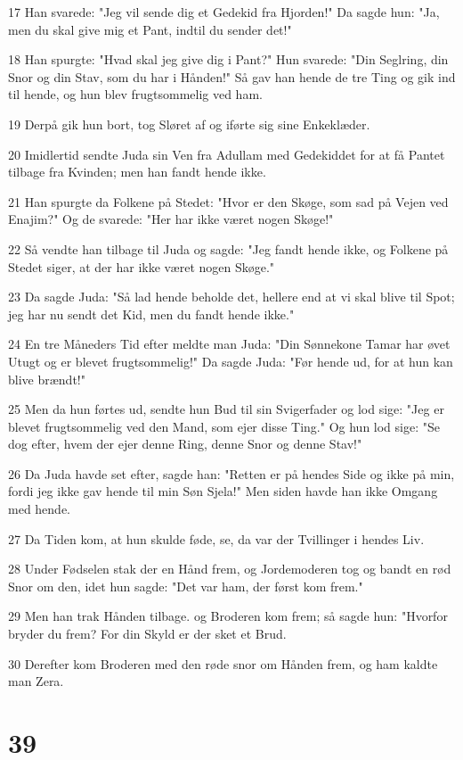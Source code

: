 \par 17 Han svarede: "Jeg vil sende dig et Gedekid fra Hjorden!" Da sagde hun: "Ja, men du skal give mig et Pant, indtil du sender det!"
\par 18 Han spurgte: "Hvad skal jeg give dig i Pant?" Hun svarede: "Din Seglring, din Snor og din Stav, som du har i Hånden!" Så gav han hende de tre Ting og gik ind til hende, og hun blev frugtsommelig ved ham.
\par 19 Derpå gik hun bort, tog Sløret af og iførte sig sine Enkeklæder.
\par 20 Imidlertid sendte Juda sin Ven fra Adullam med Gedekiddet for at få Pantet tilbage fra Kvinden; men han fandt hende ikke.
\par 21 Han spurgte da Folkene på Stedet: "Hvor er den Skøge, som sad på Vejen ved Enajim?" Og de svarede: "Her har ikke været nogen Skøge!"
\par 22 Så vendte han tilbage til Juda og sagde: "Jeg fandt hende ikke, og Folkene på Stedet siger, at der har ikke været nogen Skøge."
\par 23 Da sagde Juda: "Så lad hende beholde det, hellere end at vi skal blive til Spot; jeg har nu sendt det Kid, men du fandt hende ikke."
\par 24 En tre Måneders Tid efter meldte man Juda: "Din Sønnekone Tamar har øvet Utugt og er blevet frugtsommelig!" Da sagde Juda: "Før hende ud, for at hun kan blive brændt!"
\par 25 Men da hun førtes ud, sendte hun Bud til sin Svigerfader og lod sige: "Jeg er blevet frugtsommelig ved den Mand, som ejer disse Ting." Og hun lod sige: "Se dog efter, hvem der ejer denne Ring, denne Snor og denne Stav!"
\par 26 Da Juda havde set efter, sagde han: "Retten er på hendes Side og ikke på min, fordi jeg ikke gav hende til min Søn Sjela!" Men siden havde han ikke Omgang med hende.
\par 27 Da Tiden kom, at hun skulde føde, se, da var der Tvillinger i hendes Liv.
\par 28 Under Fødselen stak der en Hånd frem, og Jordemoderen tog og bandt en rød Snor om den, idet hun sagde: "Det var ham, der først kom frem."
\par 29 Men han trak Hånden tilbage. og Broderen kom frem; så sagde hun: "Hvorfor bryder du frem? For din Skyld er der sket et Brud.
\par 30 Derefter kom Broderen med den røde snor om Hånden frem, og ham kaldte man Zera.

\chapter{39}

